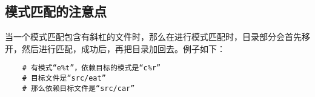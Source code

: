 \documentclass[a4paper,left=2.5cm,right=2.5cm,11pt]{article}
\begin{document}
\subsection{模式匹配的注意点}
	当一个模式匹配包含有斜杠的文件时，那么在进行模式匹配时，目录部分会首先移开，然后进行匹配，成功后，再把目录加回去。例子如下：
	\begin{lstlisting}
	# 有模式“e%t”，依赖目标的模式是“c%r”
	# 目标文件是“src/eat”
	# 那么依赖目标文件是“src/car”
	\end{lstlisting}

  
\end{document}
